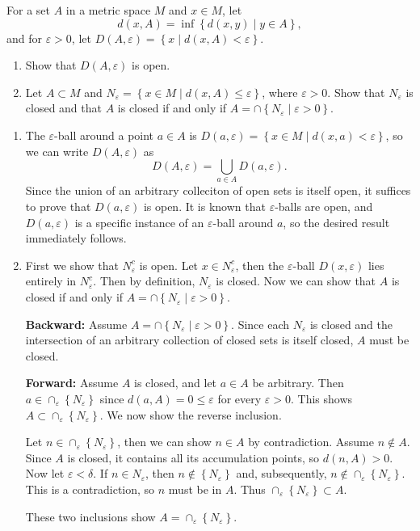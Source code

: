 \documentclass[10pt]{amsart}
\theoremstyle{plain}
\newenvironment{exercise}[1]{%
  \renewcommand\themanualtheoreminner{#1}%
  \manualtheoreminner
}{\endmanualtheoreminner}
\theoremstyle{definition}
\begin{document}
\begin{exercise}{2.20}
	For a set $A$ in a metric space $M$ and $x \in M$, let
	\[
		d(x,A) = \inf\left\{ d(x,y) \;|\; y \in A \right\},
	\] 
	and for $\varepsilon>0$, let $D(A,\varepsilon) = \left\{ x \;|\; d(x,A) < \varepsilon \right\}$.
	\begin{enumerate}
		\item Show that $D(A,\varepsilon)$ is open.
		\item Let $A \subset M$ and $N_\varepsilon = \left\{ x\in M \;|\; d(x,A) \leq \varepsilon \right\}$, where $ \varepsilon>0$. Show that $N_\varepsilon$ is closed and that $A$ is closed if and only if $A = \cap \left\{ N_\varepsilon \;|\; \varepsilon>0 \right\}$.
	\end{enumerate}
	\hrulefill
\end{exercise}
\begin{enumerate}
	\item
		The $ \varepsilon$-ball around a point $a\in A$ is $D(a,\varepsilon) = \left\{ x\in M \;|\; d(x,a) < \varepsilon \right\}$, so we can write $D(A,\varepsilon)$ as
		 \[
			 D(A,\varepsilon) = \bigcup_{a \in A} D(a,\varepsilon).
		\] 
		Since the union of an arbitrary colleciton of open sets is itself open, it suffices to prove that $D(a,\varepsilon)$ is open. It is known that $\varepsilon$-balls are open, and $D(a,\varepsilon)$ is a specific instance of an $\varepsilon$-ball around $a$, so the desired result immediately follows.
	
	\item 
		First we show that $N_\varepsilon^c$ is open. Let $x \in N_\varepsilon^c$, then the $\varepsilon$-ball $D(x,\varepsilon)$ lies entirely in $N_\varepsilon^c$. Then by definition, $N_\varepsilon$ is closed. Now we can show that $A$ is closed if and only if $A=\cap\left\{ N_\varepsilon\;|\;\varepsilon>0 \right\}$.

		\textbf{Backward:} Assume $A = \cap\left\{ N_\varepsilon\;|\;\varepsilon>0 \right\}$. Since each  $N_\varepsilon$ is closed and the intersection of an arbitrary collection of closed sets is itself closed, $A$ must be closed.

		\textbf{Forward:} Assume $A$ is closed, and let $a \in A$ be arbitrary. Then $a \in \cap_\varepsilon \left\{ N_\varepsilon \right\}$ since $d(a,A) = 0 \leq \varepsilon$ for every $\varepsilon>0$. This shows $A \subset \cap_\varepsilon \left\{ N_\varepsilon \right\}$. We now show the reverse inclusion.

		Let $n \in \cap_\varepsilon \left\{ N_\varepsilon \right\}$, then we can show $n \in A$ by contradiction. Assume $n \not\in A$. Since $A$ is closed, it contains all its accumulation points, so $d(n,A) > 0$. Now let $\varepsilon<\delta$. If $n \in N_\varepsilon$, then $n \not\in \left\{ N_\varepsilon \right\}$ and, subsequently, $n \not\in \cap_\varepsilon \left\{ N_\varepsilon \right\}$. This is a contradiction, so $n$ must be in $A$. Thus $\cap_\varepsilon \left\{ N_\varepsilon \right\} \subset A$.

		These two inclusions show $A = \cap_\varepsilon \left\{ N_\varepsilon \right\}$.
\end{enumerate}
\end{document}
